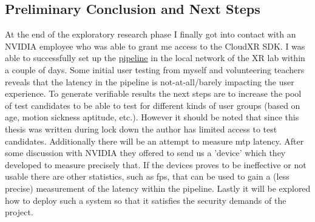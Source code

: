 \subsection{Preliminary Conclusion and Next Steps}
At the end of the exploratory research phase I finally got into contact with an NVIDIA employee who was able to grant me access to the CloudXR SDK. I was able to successfully set up the \hyperref[fig:pr0]{pipeline} in the local network of the XR lab within a couple of days. Some initial user testing from myself and volunteering teachers reveals that the latency in the pipeline is not-at-all/barely impacting the user experience. To generate verifiable results the next steps are to increase the pool of test candidates to be able to test for different kinds of user groups (based on age, motion sickness aptitude, etc.). However it should be noted that since this thesis was written during lock down the author has limited access to test candidates. Additionally there will be an attempt to measure \acrshort{mtp} latency. After some discussion with NVIDIA they offered to send us a 'device' which they developed to measure precisely that. If the devices proves to be ineffective or not usable there are other statistics, such as \acrshort{fps}, that can be used to gain a (less precise) measurement of the latency within the pipeline. Lastly it will be explored how to deploy such a system so that it satisfies the security demands of the project.